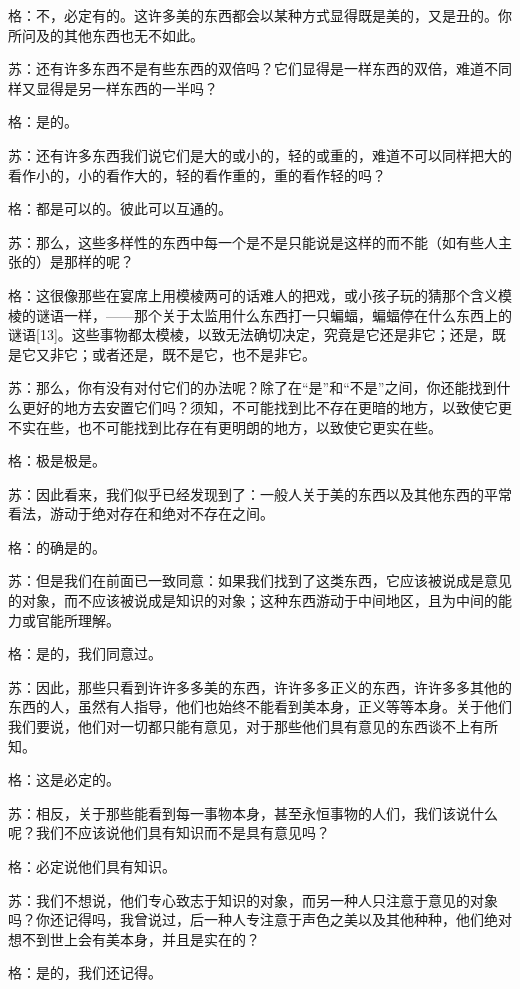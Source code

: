 \documentclass[12pt,oneside]{book}
\begin{document}
格：不，必定有的。这许多美的东西都会以某种方式显得既是美的，又是丑的。你所问及的其他东西也无不如此。

苏：还有许多东西不是有些东西的双倍吗？它们显得是一样东西的双倍，难道不同样又显得是另一样东西的一半吗？

格：是的。

苏：还有许多东西我们说它们是大的或小的，轻的或重的，难道不可以同样把大的看作小的，小的看作大的，轻的看作重的，重的看作轻的吗？

格：都是可以的。彼此可以互通的。

苏：那么，这些多样性的东西中每一个是不是只能说是这样的而不能（如有些人主张的）是那样的呢？

格：这很像那些在宴席上用模棱两可的话难人的把戏，或小孩子玩的猜那个含义模棱的谜语一样，——那个关于太监用什么东西打一只蝙蝠，蝙蝠停在什么东西上的谜语[13]。这些事物都太模棱，以致无法确切决定，究竟是它还是非它；还是，既是它又非它；或者还是，既不是它，也不是非它。

苏：那么，你有没有对付它们的办法呢？除了在“是”和“不是”之间，你还能找到什么更好的地方去安置它们吗？须知，不可能找到比不存在更暗的地方，以致使它更不实在些，也不可能找到比存在有更明朗的地方，以致使它更实在些。

格：极是极是。

苏：因此看来，我们似乎已经发现到了：一般人关于美的东西以及其他东西的平常看法，游动于绝对存在和绝对不存在之间。

格：的确是的。

苏：但是我们在前面已一致同意：如果我们找到了这类东西，它应该被说成是意见的对象，而不应该被说成是知识的对象；这种东西游动于中间地区，且为中间的能力或官能所理解。

格：是的，我们同意过。

苏：因此，那些只看到许许多多美的东西，许许多多正义的东西，许许多多其他的东西的人，虽然有人指导，他们也始终不能看到美本身，正义等等本身。关于他们我们要说，他们对一切都只能有意见，对于那些他们具有意见的东西谈不上有所知。

格：这是必定的。

苏：相反，关于那些能看到每一事物本身，甚至永恒事物的人们，我们该说什么呢？我们不应该说他们具有知识而不是具有意见吗？

格：必定说他们具有知识。

苏：我们不想说，他们专心致志于知识的对象，而另一种人只注意于意见的对象吗？你还记得吗，我曾说过，后一种人专注意于声色之美以及其他种种，他们绝对想不到世上会有美本身，并且是实在的？

格：是的，我们还记得。
\end{document}
